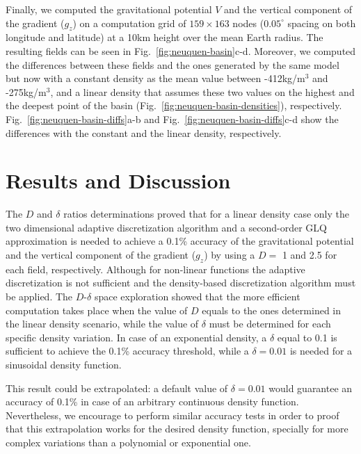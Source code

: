 \documentclass[extra, referee]{gji}
\begin{document}
Finally, we computed the gravitational potential $V$ and the vertical component of the
gradient ($g_z$) on a computation grid of $159\times163$ nodes ($0.05^\circ$ spacing on
both longitude and latitude) at a 10km height over the mean Earth radius.
The resulting fields can be seen in Fig.~\ref{fig:neuquen-basin}c-d.
Moreover, we computed the differences between these fields and the ones generated by the
same model but now with a constant density as the mean value between -412kg/m$^3$ and
-275kg/m$^3$, and a linear density that assumes these two values on the highest and the
deepest point of the basin (Fig.~\ref{fig:neuquen-basin-densities}), respectively.
Fig.~\ref{fig:neuquen-basin-diffs}a-b and Fig.~\ref{fig:neuquen-basin-diffs}c-d show the
differences with the constant and the linear density, respectively.



\section{Results and Discussion}

The $D$ and $\delta$ ratios determinations proved that for a linear density case only
the two dimensional adaptive discretization algorithm and a second-order GLQ
approximation is needed to achieve a 0.1\% accuracy of the gravitational potential and
the vertical component of the gradient ($g_z$) by using a $D=$ 1 and 2.5 for each field,
respectively.
Although for non-linear functions the adaptive discretization is not sufficient and the
density-based discretization algorithm must be applied.
The $D$-$\delta$ space exploration showed that the more efficient computation takes
place when the value of $D$ equals to the ones determined in the linear density
scenario, while the value of $\delta$ must be determined for each specific density
variation.
In case of an exponential density, a $\delta$ equal to 0.1 is sufficient to achieve the
0.1\% accuracy threshold, while a $\delta = 0.01$ is needed for a sinusoidal density
function.

This result could be extrapolated: a default value of $\delta = 0.01$ would guarantee an
accuracy of 0.1\% in case of an arbitrary continuous density function.
Nevertheless, we encourage to perform similar accuracy tests in order to proof that this
extrapolation works for the desired density function, specially for more complex
variations than a polynomial or exponential one.
\end{document}
